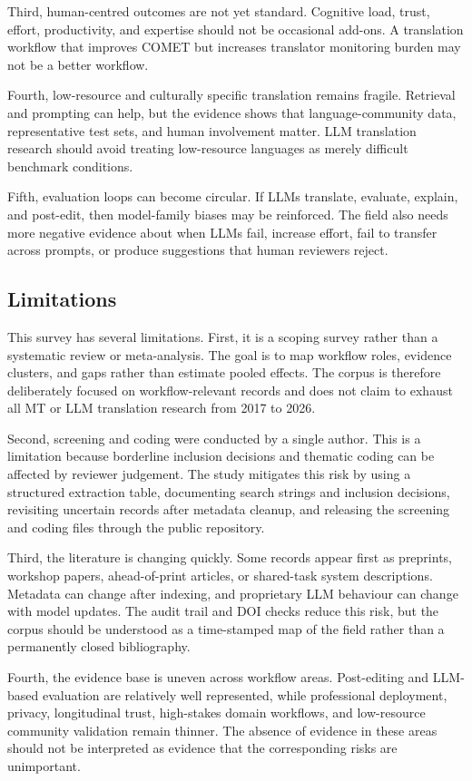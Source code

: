 \documentclass[11pt]{article}
\begin{document}
Third, human-centred outcomes are not yet standard. Cognitive load, trust, effort, productivity, and expertise should not be occasional add-ons. A translation workflow that improves COMET but increases translator monitoring burden may not be a better workflow.

Fourth, low-resource and culturally specific translation remains fragile. Retrieval and prompting can help, but the evidence shows that language-community data, representative test sets, and human involvement matter. LLM translation research should avoid treating low-resource languages as merely difficult benchmark conditions.

Fifth, evaluation loops can become circular. If LLMs translate, evaluate, explain, and post-edit, then model-family biases may be reinforced. The field also needs more negative evidence about when LLMs fail, increase effort, fail to transfer across prompts, or produce suggestions that human reviewers reject.

\subsection{Limitations}
This survey has several limitations. First, it is a scoping survey rather than a systematic review or meta-analysis. The goal is to map workflow roles, evidence clusters, and gaps rather than estimate pooled effects. The corpus is therefore deliberately focused on workflow-relevant records and does not claim to exhaust all MT or LLM translation research from 2017 to 2026.

Second, screening and coding were conducted by a single author. This is a limitation because borderline inclusion decisions and thematic coding can be affected by reviewer judgement. The study mitigates this risk by using a structured extraction table, documenting search strings and inclusion decisions, revisiting uncertain records after metadata cleanup, and releasing the screening and coding files through the public repository.

Third, the literature is changing quickly. Some records appear first as preprints, workshop papers, ahead-of-print articles, or shared-task system descriptions. Metadata can change after indexing, and proprietary LLM behaviour can change with model updates. The audit trail and DOI checks reduce this risk, but the corpus should be understood as a time-stamped map of the field rather than a permanently closed bibliography.

Fourth, the evidence base is uneven across workflow areas. Post-editing and LLM-based evaluation are relatively well represented, while professional deployment, privacy, longitudinal trust, high-stakes domain workflows, and low-resource community validation remain thinner. The absence of evidence in these areas should not be interpreted as evidence that the corresponding risks are unimportant.
\end{document}
